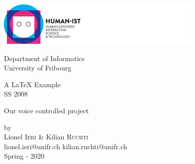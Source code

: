 \begin{titlepage} 
	\begin{center}
		
		\includegraphics[scale=.6]{Report/images/human-ist.png}\\
		
		\vspace{0.5cm}
		
		Department of Informatics\\
		University of Fribourg\\

		\vspace{3cm}
		
		\begin{large}
		A \LaTeX{} Example\\
		SS 2008\\
		\end{large}
		
		\vspace{3cm}
		
		\begin{huge}
			{\sf Our voice controlled project}
		\end{huge}
		
				
		\vspace{3cm}
		
		\begin{large}
			\vspace{1cm}
			 by\\
			 Lionel \textsc{Ieri} \& Kilian \textsc{Ruchti}\\
			lionel.ieri@unifr.ch kilian.ruchti@unifr.ch\\
			\vspace{0.2cm}
			Spring - 2020
		\end{large}
				
	\end{center}
\end{titlepage}
